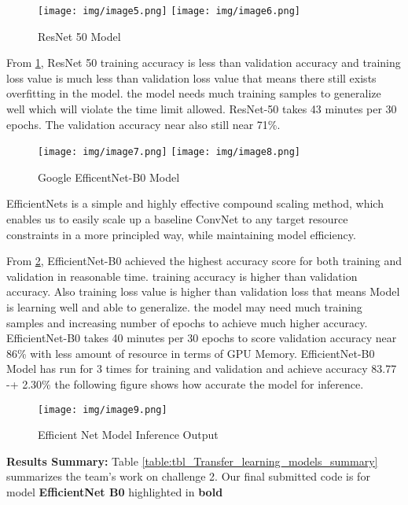 \documentclass[10pt,twocolumn,letterpaper]{article}
\begin{document}
\begin{figure}[h]

\centering
\texttt{[image: img/image5.png]}
\texttt{[image: img/image6.png]}
\caption{ResNet 50 Model\label{fig_resnet50}}
\end{figure}

From \ref{fig_resnet50}, ResNet 50 training accuracy is less than validation accuracy and training loss value is much less than validation loss value that means there still exists overfitting in the model. the model needs much training samples to generalize well which will violate the time limit allowed. ResNet-50 takes 43 minutes per 30 epochs. The validation accuracy near also still near 71\%.

\begin{figure}[h]

\centering
\texttt{[image: img/image7.png]}
\texttt{[image: img/image8.png]}
\caption{Google EfficentNet-B0 Model\label{fig_efficientNetB0}}
\end{figure}

EfficientNets is a simple and highly effective compound scaling method, which enables us to easily scale up a baseline ConvNet to any target resource constraints in a more principled way, while maintaining model efficiency\cite{Efficientnet}.

From \ref{fig_efficientNetB0}, EfficientNet-B0 achieved the highest accuracy score for both training and validation in reasonable time. training accuracy is higher than validation accuracy. Also training loss value is higher than validation loss that means Model is learning well and able to generalize. the model may need much training samples and increasing number of epochs to achieve much higher accuracy. EfficientNet-B0 takes 40 minutes per 30 epochs to score validation accuracy near 86\% with less amount of resource in terms of GPU Memory. EfficientNet-B0 Model has run for 3 times for training and validation and achieve accuracy 83.77 -+ 2.30\% the following figure shows how accurate the model for inference.
\begin{figure}[h]

 \centering
 \texttt{[image: img/image9.png]}
 \caption{Efficient Net Model Inference Output\label{fig_challange2_infer_results}}
\end{figure}

\textbf{Results Summary:} Table \ref{table:tbl_Transfer_learning_models_summary} summarizes the team's work on challenge 2. Our final submitted code is for model \textbf{EfficientNet B0} highlighted in \textbf{bold}
\end{document}
